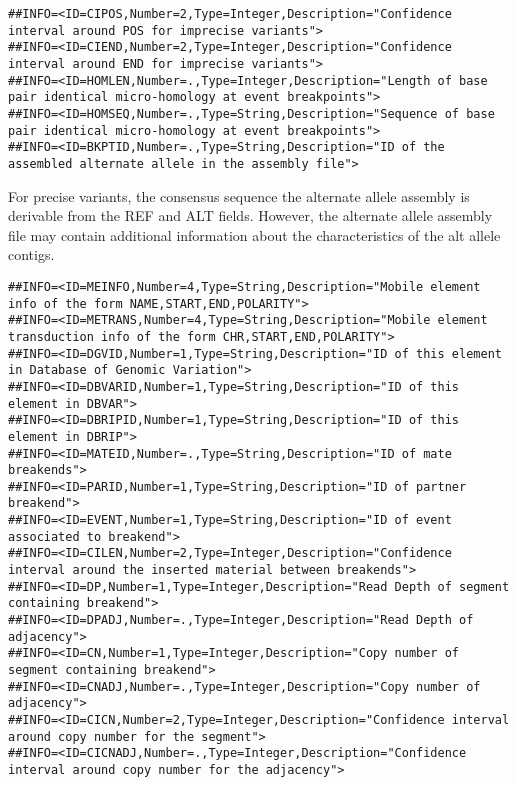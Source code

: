 \documentclass[8pt]{article}
\begin{document}
\footnotesize
\begin{verbatim}
##INFO=<ID=CIPOS,Number=2,Type=Integer,Description="Confidence interval around POS for imprecise variants">
##INFO=<ID=CIEND,Number=2,Type=Integer,Description="Confidence interval around END for imprecise variants">
##INFO=<ID=HOMLEN,Number=.,Type=Integer,Description="Length of base pair identical micro-homology at event breakpoints">
##INFO=<ID=HOMSEQ,Number=.,Type=String,Description="Sequence of base pair identical micro-homology at event breakpoints">
##INFO=<ID=BKPTID,Number=.,Type=String,Description="ID of the assembled alternate allele in the assembly file">
\end{verbatim}
\normalsize
For precise variants, the consensus sequence the alternate allele assembly is derivable from the REF and ALT fields.
However, the alternate allele assembly file may contain additional information about the characteristics of the alt allele contigs.

\footnotesize
\begin{verbatim}
##INFO=<ID=MEINFO,Number=4,Type=String,Description="Mobile element info of the form NAME,START,END,POLARITY">
##INFO=<ID=METRANS,Number=4,Type=String,Description="Mobile element transduction info of the form CHR,START,END,POLARITY">
##INFO=<ID=DGVID,Number=1,Type=String,Description="ID of this element in Database of Genomic Variation">
##INFO=<ID=DBVARID,Number=1,Type=String,Description="ID of this element in DBVAR">
##INFO=<ID=DBRIPID,Number=1,Type=String,Description="ID of this element in DBRIP">
##INFO=<ID=MATEID,Number=.,Type=String,Description="ID of mate breakends">
##INFO=<ID=PARID,Number=1,Type=String,Description="ID of partner breakend">
##INFO=<ID=EVENT,Number=1,Type=String,Description="ID of event associated to breakend">
##INFO=<ID=CILEN,Number=2,Type=Integer,Description="Confidence interval around the inserted material between breakends">
##INFO=<ID=DP,Number=1,Type=Integer,Description="Read Depth of segment containing breakend">
##INFO=<ID=DPADJ,Number=.,Type=Integer,Description="Read Depth of adjacency">
##INFO=<ID=CN,Number=1,Type=Integer,Description="Copy number of segment containing breakend">
##INFO=<ID=CNADJ,Number=.,Type=Integer,Description="Copy number of adjacency">
##INFO=<ID=CICN,Number=2,Type=Integer,Description="Confidence interval around copy number for the segment">
##INFO=<ID=CICNADJ,Number=.,Type=Integer,Description="Confidence interval around copy number for the adjacency">
\end{verbatim}
\normalsize
\end{document}
